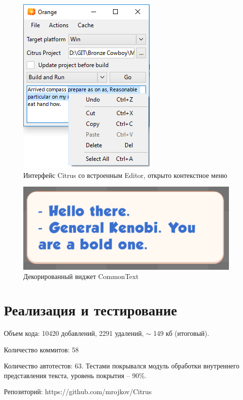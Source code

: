\documentclass{fefu}
\begin{document}
			\begin{figure}[H]
				\centering
				\includegraphics[width=0.5\linewidth]{images/EditorContextMenu.png}
				\caption{Интерфейс Citrus со встроенным Editor, открыто контекстное меню}
			\end{figure}
			\begin{figure}[H]
				\centering
				\includegraphics[width=1\linewidth]{images/DecoratedBubble.png}
				\caption{Декорированный виджет CommonText}
			\end{figure}
	\section{Реализация и тестирование}
		\par Объем кода: 10420 добавлений, 2291 удалений, $\sim$ 149 кб (итоговый).
		\par Количество коммитов: 58
		\par Количество автотестов: 63. Тестами покрывался модуль обработки внутреннего 
		представления текста, уровень покрытия -- 90\%.
		\par Репозиторий: https://github.com/mrojkov/Citrus
\end{document}
